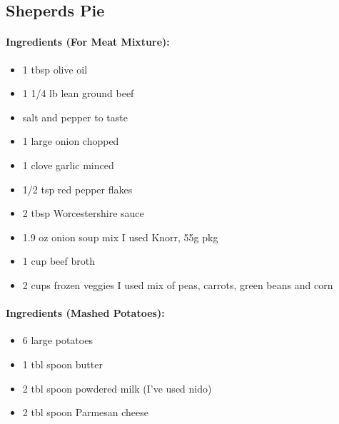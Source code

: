 \documentclass{article}
\begin{document}
\subsection{Sheperds Pie}
\paragraph{Ingredients (For Meat Mixture):}
\begin{itemize}
  \item 1 tbsp olive oil
  \item 1 1/4 lb lean ground beef
  \item salt and pepper to taste
  \item 1 large onion chopped
  \item 1 clove garlic minced
  \item 1/2 tsp red pepper flakes
  \item 2 tbsp Worcestershire sauce
  \item 1.9 oz onion soup mix I used Knorr, 55g pkg
  \item 1 cup beef broth
  \item 2 cups frozen veggies I used mix of peas, carrots, green beans and corn
\end{itemize}

\paragraph{Ingredients (Mashed Potatoes):}
\begin{itemize}
  \item 6 large potatoes
  \item 1 tbl spoon butter
  \item 2 tbl spoon powdered milk (I’ve used nido)
  \item 2 tbl spoon Parmesan cheese
\end{itemize}
\end{document}
